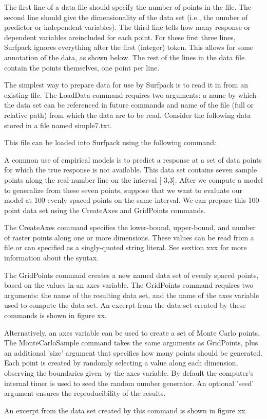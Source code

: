 \documentclass{article}
\begin{document}
The first line of a data file should specify the number of points in the file.  The second line should give the dimensionality of the data set (i.e., the number of predictor or independent variables).  The third line tells how many response or dependent variables areincluded for each point.  For these first three lines, Surfpack ignores everything after the first (integer) token.  This allows for some annotation of the data, as shown below. 
The rest of the lines in the data file contain the points themselves, one point per
line.   



The simplest way to prepare data for use by Surfpack is to read it in from an existing file.  The LoadData command requires two arguments: a name by which the data set can be referenced in future commands and name of the file (full or relative path) from which the data are to be read.  Consider the following data stored in a file named simple7.txt.

This file can be loaded into Surfpack using the following command:

A common use of empirical models is to predict a response at a set of data points for which the true response is not available.  This data set contains seven sample points along the real-number line on the interval [-3,3].  After we compute a model to generalize from these seven points, suppose that we want to evaluate our model at 100 evenly spaced points on the same interval.  We can prepare this 100-point data set using the CreateAxes and GridPoints commands.

The CreateAxes command specifies the lower-bound, upper-bound, and number of raster points along one or more dimensions.  These values can be read from a file or can specified as a singly-quoted string literal.  See sextion xxx for more information about the syntax.

The GridPoints command creates a new named data set of evenly spaced points, based on the values in an axes variable.  The GridPoints command requires two arguments: the name of the resulting data set, and the name of the axes variable used to compute the data set.
An excerpt from the data set created by these commands is shown in figure xx.


Alternatively, an axes variable can be used to create a set of Monte Carlo points.  The MonteCarloSample command takes the same arguments as GridPoints, plus an additional 'size' argument that specifies how many points should be generated.  Each point is created by randomly selecting a value along each dimension, observing the boundaries given by the axes variable.  By default the computer's internal timer is used to seed the random number generator. An optional 'seed' argument ensures the reproducibility of the results.

An excerpt from the data set created by this command is shown in figure xx.

\end{document}
